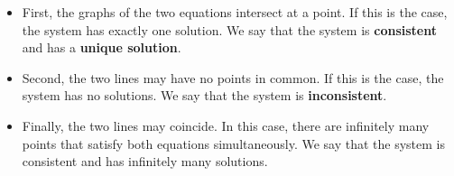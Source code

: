 \documentclass{ximera}
\begin{document}
      \begin{itemize}
          \item First, the graphs of the two equations intersect at a point.  If this is the case, the system has exactly one solution. We say that the system is \textbf{consistent} and has a \textbf{unique solution}. 
           
          \begin{center}
            \end{center}
          \item Second, the two lines may have no points in common.  If this is the case, the system has no solutions.  We say that the system is \textbf{inconsistent}. 
          \begin{center}
            \end{center}

          \item Finally, the two lines may coincide.  In this case, there are infinitely many points that satisfy both equations simultaneously.  We say that the system is consistent and has infinitely many solutions.
          
          \begin{center}
          \end{center}
          \end{itemize}
      
\end{document}
